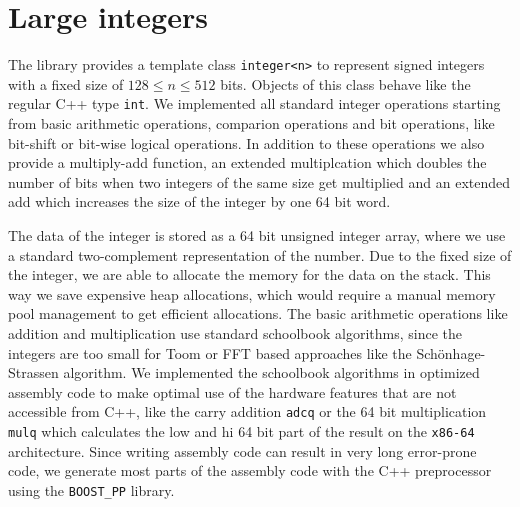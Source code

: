 \documentclass[oribibl]{llncs2e/llncs}
\begin{document}

\section{Large integers}
The library provides a template class \verb|integer<n>| to represent signed integers with a fixed size of $128 \le n \le 512$ bits.
Objects of this class behave like the regular C++ type \verb|int|.
We implemented all standard integer operations starting from basic arithmetic operations, comparion operations and bit operations, like bit-shift or bit-wise logical operations.
In addition to these operations we also provide a multiply-add function, an extended multiplcation which doubles the number of bits when two integers of the same size get multiplied and an extended add which increases the size of the integer by one 64 bit word.

The data of the integer is stored as a 64 bit unsigned integer array, where we use a standard two-complement representation of the number.
Due to the fixed size of the integer, we are able to allocate the memory for the data on the stack.
This way we save expensive heap allocations, which would require a manual memory pool management to get efficient allocations.
The basic arithmetic operations like addition and multiplication use standard schoolbook algorithms, since the integers are too small for Toom\cite{Toom} or FFT based approaches like the Sch\"onhage-Strassen algorithm\cite{Schonhage}.
We implemented the schoolbook algorithms in optimized assembly code to make optimal use of the hardware features that are not accessible from C++, like the carry addition \verb|adcq| or the 64 bit multiplication \verb|mulq| which calculates the low and hi 64 bit part of the result on the \verb|x86-64| architecture.
Since writing assembly code can result in very long error-prone code, we generate most parts of the assembly code with the C++ preprocessor using the \verb|BOOST_PP| library.
\end{document}
